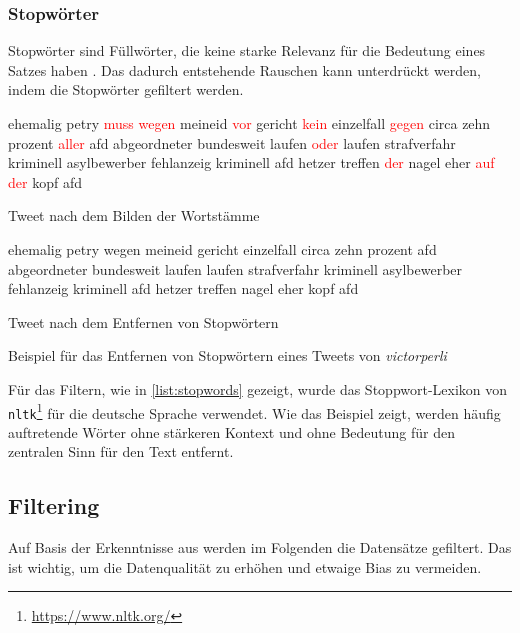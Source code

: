 \subsubsection{Stopwörter}

Stopwörter sind Füllwörter, die keine starke Relevanz für die Bedeutung eines Satzes haben \autocite[4]{kowsari_text_2019}. Das dadurch entstehende Rauschen kann unterdrückt werden, indem die Stopwörter gefiltert werden.

\begin{example}[H]
    {\footnotesize
    \begin{subexample}{0.45\textwidth}
        ehemalig petry \textcolor{red}{muss wegen} meineid \textcolor{red}{vor} gericht \textcolor{red}{kein} einzelfall \textcolor{red}{gegen} circa zehn prozent \textcolor{red}{aller} afd abgeordneter bundesweit laufen \textcolor{red}{oder} laufen strafverfahr kriminell asylbewerber fehlanzeig kriminell afd hetzer treffen \textcolor{red}{der} nagel eher \textcolor{red}{auf der} kopf afd
        \caption{Tweet nach dem Bilden der Wortstämme}
    \end{subexample}\hfill
    \begin{subexample}{0.45\textwidth}
        ehemalig petry wegen meineid gericht einzelfall circa zehn prozent afd abgeordneter bundesweit laufen laufen strafverfahr kriminell asylbewerber fehlanzeig kriminell afd hetzer treffen nagel eher kopf afd
        \caption{Tweet nach dem Entfernen von Stopwörtern}
    \end{subexample}\hfill
    }
    \caption[Beispiel -- Entfernen von Stopwörtern]{Beispiel für das Entfernen von Stopwörtern eines Tweets von \textit{victorperli} \autocite{saltzer_finding_2022}} \label{list:stopwords}
\end{example}

Für das Filtern, wie in \autoref{list:stopwords} gezeigt, wurde das Stoppwort-Lexikon von \texttt{nltk}\footnote{\href{https://www.nltk.org/}{https://www.nltk.org/}} für die deutsche Sprache verwendet. Wie das Beispiel zeigt, werden häufig auftretende Wörter ohne stärkeren Kontext und ohne Bedeutung für den zentralen Sinn für den Text entfernt.

\subsection{Filtering} \label{subsec:filtering}

Auf Basis der Erkenntnisse aus  werden im Folgenden die Datensätze gefiltert. Das ist wichtig, um die Datenqualität zu erhöhen und etwaige Bias zu vermeiden.

